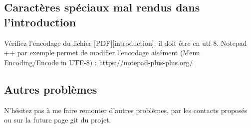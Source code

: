 \documentclass[12pt,french]{article}
\begin{document}
\subsection{Caractères spéciaux mal rendus dans l'introduction}
Vérifiez l'encodage du fichier [PDF][introduction], il doit être en utf-8. Notepad\,++ par exemple permet de modifier l'encodage aisément (Menu Encoding/\linebreak[0] Encode in UTF-8) : \url{https://notepad-plus-plus.org/}
\subsection{Autres problèmes}
N'hésitez pas à me faire remonter d'autres problèmes, par les contacts proposés ou sur la future page git du projet.
\end{document}

